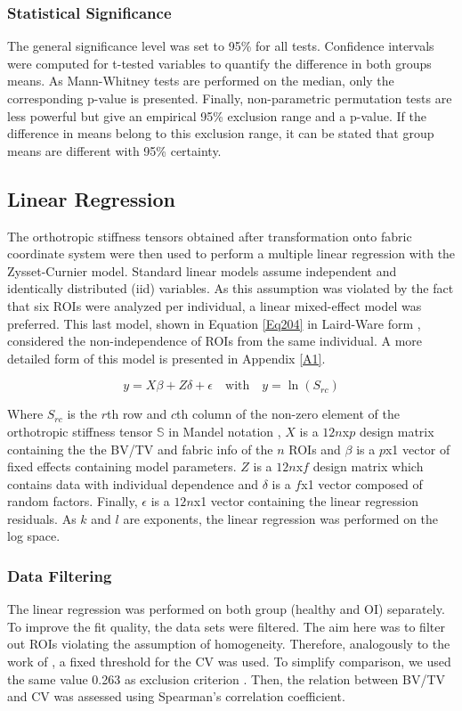 \documentclass[a4paper,fleqn]{DC_ArtStyle}
\begin{document}
\subsubsection{Statistical Significance}
The general significance level was set to 95\% for all tests. Confidence intervals were computed for t-tested variables to quantify the difference in both groups means. As Mann-Whitney tests are performed on the median, only the corresponding p-value is presented. Finally, non-parametric permutation tests are less powerful but give an empirical 95\% exclusion range and a p-value. If the difference in means belong to this exclusion range, it can be stated that group means are different with 95\% certainty.

\subsection{Linear Regression}
The orthotropic stiffness tensors obtained after transformation onto fabric coordinate system were then used to perform a multiple linear regression with the Zysset-Curnier model. Standard linear models assume independent and identically distributed (iid) variables. As this assumption was violated by the fact that six ROIs were analyzed per individual, a linear mixed-effect model was preferred. This last model, shown in Equation \ref{Eq204} in Laird-Ware form \cite{Laird1982}, considered the non-independence of ROIs from the same individual. A more detailed form of this model is presented in Appendix \ref{A1}.

\begin{equation}
	y = X \beta + Z \delta + \epsilon \quad \text{with} \quad y = \ln(S_{rc})
	\label{Eq204}
\end{equation}

Where $S_{rc}$ is the $r$th row and $c$th column of the non-zero element of the orthotropic stiffness tensor $\mathbb{S}$ in Mandel notation \cite{MANDEL1965}, $X$ is a $12n$x$p$ design matrix containing the the BV/TV and fabric info of the $n$ ROIs and $\beta$ is a $p$x1 vector of fixed effects containing model parameters. $Z$ is a $12n$x$f$ design matrix which contains data with individual dependence and $\delta$ is a $f$x1 vector composed of random factors. Finally, $\epsilon$ is a $12n$x1 vector containing the linear regression residuals. As $k$ and $l$ are exponents, the linear regression was performed on the log space.\\

\subsubsection{Data Filtering}
The linear regression was performed on both group (heal\-thy and OI) separately. To improve the fit quality, the data sets were filtered. The aim here was to filter out ROIs violating the assumption of homogeneity. Therefore, analogously to the work of \citeauthor{Panyasantisuk2015}\cite{Panyasantisuk2015}, a fixed threshold for the CV was used. To simplify comparison, we used the same value 0.263 as exclusion criterion \cite{Panyasantisuk2015}. Then, the relation between BV/TV and CV was assessed using Spearman's correlation coefficient. 
\end{document}

